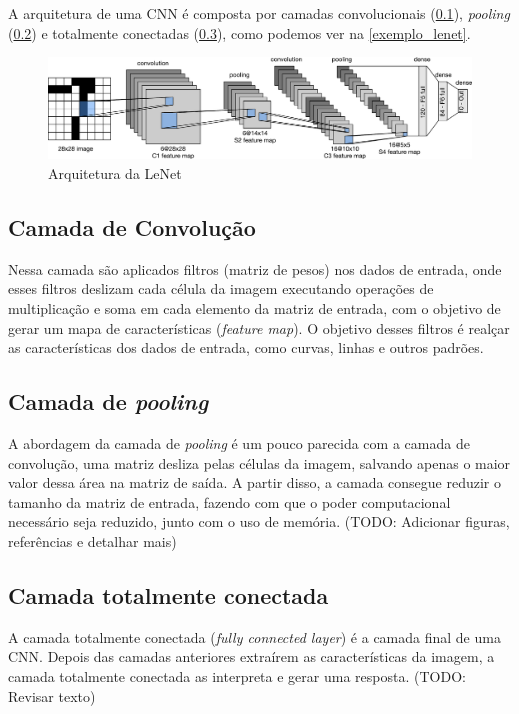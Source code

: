 A arquitetura de uma CNN é composta por camadas convolucionais (\ref{cap_conceitos_cnn_conv}),
\textit{pooling} (\ref{cap_conceitos_cnn_pooling}) e totalmente conectadas (\ref{cap_conceitos_cnn_totalmente}),
como podemos ver na \autoref{exemplo_lenet}.

\begin{figure}[htb]
	\caption {\label{exemplo_lenet} Arquitetura da LeNet}
	\begin{center}
		\includegraphics[scale=0.5]{Imagens/lenet}
	\end{center}
\end{figure}

\subsection{Camada de Convolução}\label{cap_conceitos_cnn_conv}
Nessa camada são aplicados filtros (matriz de pesos) nos dados de entrada,
onde esses filtros deslizam cada célula da imagem executando operações de multiplicação e soma
em cada elemento da matriz de entrada, com o objetivo de gerar um mapa de características (\textit{feature map}).
O objetivo desses filtros é realçar as características dos dados de entrada, como curvas, linhas e outros padrões.

\subsection{Camada de \textit{pooling}}\label{cap_conceitos_cnn_pooling}
A abordagem da camada de \textit{pooling} é um pouco parecida com a camada de convolução,
uma matriz desliza pelas células da imagem, salvando apenas o maior valor dessa área na matriz de saída.
A partir disso, a camada consegue reduzir o tamanho da matriz de entrada, fazendo com que o poder computacional
necessário seja reduzido, junto com o uso de memória.
(TODO: Adicionar figuras, referências e detalhar mais)

\subsection{Camada totalmente conectada}\label{cap_conceitos_cnn_totalmente}
A camada totalmente conectada (\textit{fully connected layer}) é a camada final de uma CNN.
Depois das camadas anteriores extraírem as características da imagem, a camada totalmente
conectada as interpreta e gerar uma resposta.
(TODO: Revisar texto)

